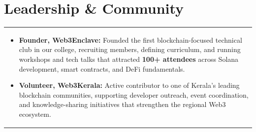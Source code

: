 \documentclass[a4paper,10pt]{article}
\begin{document}
\section{Leadership \& Community}
\begin{tabularx}{\linewidth}{@{}X@{}}
    \begin{itemize}[nosep, after=\strut, leftmargin=2em, itemsep=1.5pt]
 
        \item \textbf{Founder, Web3Enclave:} Founded the first blockchain-focused technical club in our college, recruiting members, defining curriculum, and running workshops and tech talks that attracted \textbf{100+ attendees} across Solana development, smart contracts, and DeFi fundamentals.
 
        \item \textbf{Volunteer, Web3Kerala:} Active contributor to one of Kerala's leading blockchain communities, supporting developer outreach, event coordination, and knowledge-sharing initiatives that strengthen the regional Web3 ecosystem.
 
    \end{itemize}
\end{tabularx}
\end{document}
